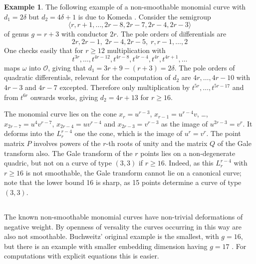 \documentclass{amsart}
\newcommand{\mO}{\mathcal{O}}
\theoremstyle{definition}
\newtheorem{ex}[thm]{Example}
\theoremstyle{remark}
\begin{document}
 \begin{ex}
 The following example  of a non-smoothable monomial curve with $d_1=2\delta$ but $d_2=4\delta +1$ is due to Komeda \cite[Example 2.4 (2)]{Ko}. Consider
 the semigroup
 \[
 \langle r,r+1,\dots,2r-8,2r-7, 2r-4,2r-3\rangle
 \]
 of genus $g=r+3$ with conductor $2r$. The pole orders of differentials are
 \[
 2r, 2r-1,\;2r-4,2r-5,\;r,r-1,\dots,2
 \]
One checks easily that for $r\geq 12$ multiplication with 
%
\[t^{3r},\dots,t^{4r-12},t^{4r-8},t^{4r-4},t^{4r},t^{4r+1},
\dots
\]
 maps $\omega$ into $\mO$, giving that $d_1=3r+9 - (r+3)=2\delta$. The pole orders of
 quadratic differentials, relevant for the computation of $d_2$ are $4r,\dots, 4r-10$
 with $4r-3$ and $4r-7$ excepted. Therefore only multiplication by $t^{5r},\dots, t^{5r-17}$ and 
 from $t^{6r}$ onwards works, giving $d_2=4r+13$ for $r\geq 16$. 
 
  The  monomial curve lies on the cone $x_r=u^{r-3}$, 
  $x_{r-1}=u^{r-4}v$, \dots, $ x_{2r-7}=u^4v^{r-7}$, $x_{2r-4}=uv^{r-4}$ 
  and $x_{2r-3}=v^{r-3}$ as
  the image of $u^{2r-3}=v^r$.
  It deforms into the  $L_r^{r-4}$ one the cone, which is the image of $u^r=v^r$. The point matrix 
  $P$ involves powers of the $r$-th roots of unity and the matrix $Q$ of the Gale transform also.
  The Gale transform of the $r$ points lies on a non-degenerate quadric, but not on a curve
  of type $(3,3)$ if $r\geq 16$. Indeed, as this $L_r^{r-4}$ with $r\geq 16$ is not smoothable,
 the Gale transform cannot lie on a canonical curve; note that the lower bound 16 is sharp, as
 15 points determine a curve  of type $(3,3)$.
 \end{ex}
 
\subsection{} The known non-smoothable monomial curves have non-trivial deformations of
negative weight. By openness of versality the curves occurring in this way are also not
smoothable. Buchweitz' original example is the smallest, with $g=16$, but there is
an example with smaller embedding dimension having $g=17$ \cite{Ko}.  For computations with
explicit equations this is easier. 
\end{document}
